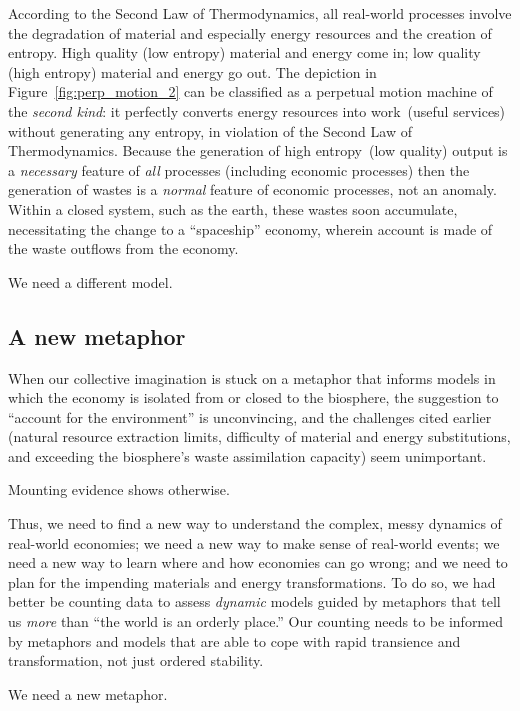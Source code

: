 According to the Second Law of Thermodynamics,
all real-world processes involve the degradation
of material and especially energy resources
and the creation of entropy.
High quality (low entropy) material and energy come in;
low quality (high entropy) material and energy go out.
The depiction in Figure~\ref{fig:perp_motion_2} 
can be classified as a perpetual motion machine
of the \emph{second kind}:
it perfectly converts energy resources into 
work~(useful services) without generating
any entropy,
in violation of the Second Law of Thermodynamics.
Because the generation of high entropy~(low quality)
output is a \emph{necessary} feature of \emph{all} processes 
(including economic processes)
then the generation of wastes is a \emph{normal} feature of
economic processes,
not an anomaly.
Within a closed system, such as the earth,
these wastes soon accumulate,
necessitating the change to a ``spaceship'' economy,
wherein account is made of the waste outflows from
the economy.

We need a different model.


\subsection{A new metaphor}
\label{sec:new_metaphor}

When our collective imagination is stuck on a metaphor that 
informs models in which the economy is isolated from or closed to the biosphere,
the suggestion to ``account for the environment'' is unconvincing, and 
the challenges cited earlier (natural resource extraction limits,
difficulty of material and energy substitutions, and 
exceeding the biosphere's waste assimilation capacity)
seem unimportant. 

Mounting evidence shows otherwise.

Thus, we need to find a new way to understand the complex, 
messy dynamics of real-world economies;
we need a new way to make sense of real-world events;
we need a new way to learn where and how economies can go wrong; and
we need to plan for the impending materials and energy transformations.
To do so, we had better be counting data to assess \emph{dynamic} models
guided by metaphors that tell us \emph{more} than ``the world is an orderly place.''
Our counting needs to be informed by metaphors and models that are
able to cope with rapid transience and transformation,
not just ordered stability.

We need a new metaphor.


